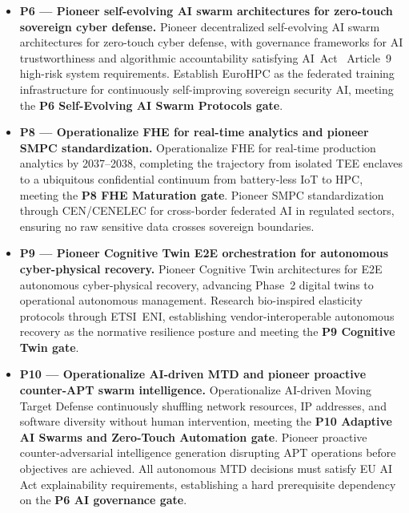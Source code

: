 \documentclass{ieeeaccess}
\begin{document}
\begin{itemize}
    \item \textbf{P6 --- Pioneer self-evolving AI swarm architectures
    for zero-touch sovereign cyber defense.}
    Pioneer decentralized self-evolving AI swarm architectures for
    zero-touch cyber defense, with governance frameworks for AI
    trustworthiness and algorithmic accountability satisfying
    AI~Act~\cite{aiact} Article~9 high-risk system requirements.
    Establish EuroHPC as the federated training infrastructure for
    continuously self-improving sovereign security AI, meeting the
    \textbf{P6 Self-Evolving AI Swarm Protocols gate}.

    \item \textbf{P8 --- Operationalize FHE for real-time analytics
    and pioneer SMPC standardization.}
    Operationalize FHE for real-time production analytics by
    2037--2038, completing the trajectory from isolated TEE enclaves
    to a ubiquitous confidential continuum from battery-less IoT to
    HPC, meeting the \textbf{P8 FHE Maturation gate}. Pioneer SMPC
    standardization through CEN/CENELEC for cross-border federated AI
    in regulated sectors, ensuring no raw sensitive data crosses
    sovereign boundaries.

    \item \textbf{P9 --- Pioneer Cognitive Twin E2E orchestration for
    autonomous cyber-physical recovery.}
    Pioneer Cognitive Twin architectures for E2E autonomous
    cyber-physical recovery, advancing Phase~2 digital twins to
    operational autonomous management. Research bio-inspired elasticity
    protocols through ETSI~ENI, establishing vendor-interoperable
    autonomous recovery as the normative resilience posture and meeting
    the \textbf{P9 Cognitive Twin gate}.

    \item \textbf{P10 --- Operationalize AI-driven MTD and pioneer
    proactive counter-APT swarm intelligence.}
    Operationalize AI-driven Moving Target Defense continuously
    shuffling network resources, IP addresses, and software diversity
    without human intervention, meeting the \textbf{P10 Adaptive
    AI Swarms and Zero-Touch Automation gate}. Pioneer proactive
    counter-adversarial intelligence generation disrupting APT
    operations before objectives are achieved. All autonomous MTD
    decisions must satisfy EU AI Act explainability requirements,
    establishing a hard prerequisite dependency on the
    \textbf{P6 AI governance gate}.

\end{itemize}
\end{document}
